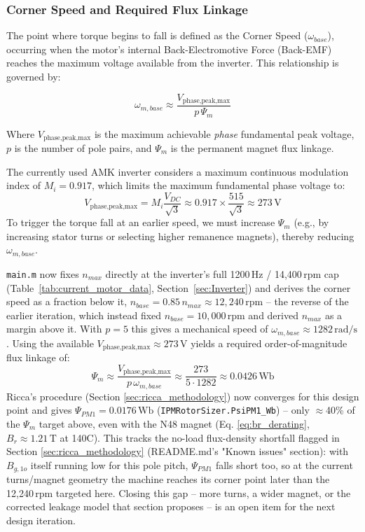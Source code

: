 \documentclass[11pt,a4paper]{article}
\begin{document}
\subsubsection*{Corner Speed and Required Flux Linkage}
\label{sec:corner_speed}
The point where torque begins to fall is defined as the Corner Speed ($\omega_{base}$), occurring when the motor's internal Back-Electromotive Force (Back-EMF) reaches the maximum voltage available from the inverter. This relationship is governed by:

\begin{equation}
\omega_{m,base} \approx \frac{V_{\text{phase,peak,max}}}{p\,\Psi_m}
\end{equation}

Where $V_{\text{phase,peak,max}}$ is the maximum achievable \emph{phase} fundamental peak voltage, $p$ is the number of pole pairs, and $\Psi_m$ is the permanent magnet flux linkage.

The currently used AMK inverter considers a maximum continuous modulation index of $M_i=0.917$, which limits the maximum fundamental phase voltage to:
\begin{equation}
    V_{\text{phase,peak,max}} = M_i \frac{V_{DC}}{\sqrt{3}} \approx 0.917 \times \frac{515}{\sqrt{3}} \approx 273\,\text{V}
\end{equation}
To trigger the torque fall at an earlier speed, we must increase $\Psi_m$ (e.g., by increasing stator turns or selecting higher remanence magnets), thereby reducing $\omega_{m,base}$.

\texttt{main.m} now fixes $n_{max}$ directly at the inverter's full 1200\,Hz / 14,400\,rpm cap (Table~\ref{tab:current_motor_data}, Section~\ref{sec:Inverter}) and derives the corner speed as a fraction below it, $n_{base}=0.85\,n_{max}\approx12{,}240\,\text{rpm}$ -- the reverse of the earlier iteration, which instead fixed $n_{base}=10{,}000\,\text{rpm}$ and derived $n_{max}$ as a margin above it. With $p=5$ this gives a mechanical speed of $\omega_{m,base}\approx 1282\,\text{rad/s}$. Using the available $V_{\text{phase,peak,max}}\approx 273\,\text{V}$ yields a required order-of-magnitude flux linkage of:
\begin{equation}
    \Psi_m \approx \frac{V_{\text{phase,peak,max}}}{p\,\omega_{m,base}} \approx \frac{273}{5 \cdot 1282} \approx 0.0426\,\text{Wb}
\end{equation}
Ricca's procedure (Section \ref{sec:ricca_methodology}) now converges for this design point and gives $\Psi_{PM1}=0.0176\,\text{Wb}$ (\texttt{IPMRotorSizer.PsiPM1\_Wb}) -- only $\approx$40\% of the $\Psi_m$ target above, even with the N48 magnet (Eq. \ref{eq:br_derating}, $B_r\approx1.21\,\text{T}$ at 140\textdegree{}C). This tracks the no-load flux-density shortfall flagged in Section \ref{sec:ricca_methodology} (README.md's "Known issues" section): with $B_{g,1o}$ itself running low for this pole pitch, $\Psi_{PM1}$ falls short too, so at the current turns/magnet geometry the machine reaches its corner point later than the 12,240\,rpm targeted here. Closing this gap -- more turns, a wider magnet, or the corrected leakage model that section proposes -- is an open item for the next design iteration.
\end{document}
